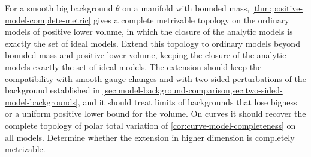 \enlargethispage{2\baselineskip}
\begin{problem}\label{qu:singularity-topology-program}\label{qu:i-good-no-bmp}
For a smooth big background $\theta$ on a manifold with bounded mass, \cref{thm:positive-model-complete-metric} gives a complete metrizable topology on the ordinary models of positive lower volume, in which the closure of the analytic models is exactly the set of ideal models. Extend this topology to ordinary models beyond bounded mass and positive lower volume, keeping the closure of the analytic models exactly the set of ideal models. The extension should keep the compatibility with smooth gauge changes and with two-sided perturbations of the background established in \cref{sec:model-background-comparison,sec:two-sided-model-backgrounds}, and it should treat limits of backgrounds that lose bigness or a uniform positive lower bound for the volume. On curves it should recover the complete topology of polar total variation of \cref{cor:curve-model-completeness} on all models. Determine whether the extension in higher dimension is completely metrizable.
\end{problem}

